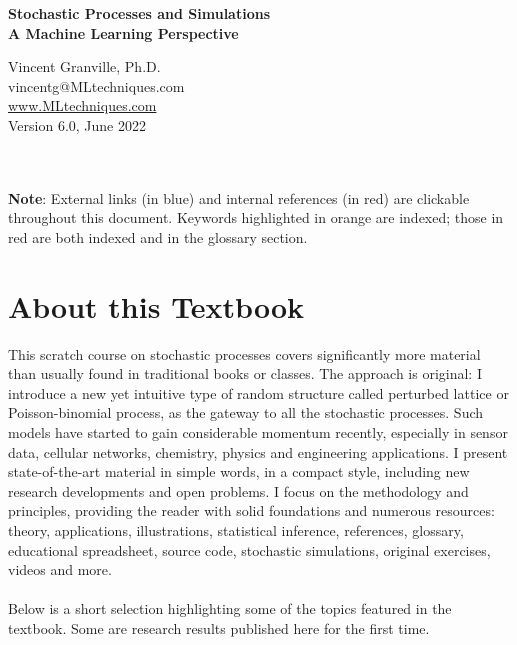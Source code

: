 \documentclass[10pt]{article}
\begin{document}
\hypersetup{linkcolor=blue}


\begin{center}
{\Large \bf{Stochastic Processes and Simulations\\
 \addvspace{1ex}
A Machine Learning Perspective}} \\
\addvspace{5ex}
\end{center}

\begin{center}
Vincent Granville, Ph.D.\\
vincentg@MLtechniques.com\\
 \href{https://mltechniques.com/}{www.MLtechniques.com}\\
\quad
Version 6.0, June 2022
\end{center}
\quad\\ \\
{\bf Note}: External links (in blue) and internal references (in red) are clickable throughout this document. Keywords highlighted in orange are indexed; those in red are both indexed and in the glossary section.


\hypersetup{linkcolor=red} %
\tableofcontents  %


\hypersetup{linkcolor=red}



\section*{About this Textbook}

This scratch course on stochastic processes covers significantly more material than usually found in traditional books or classes. The approach is original:  I introduce a new yet intuitive type of random structure called perturbed lattice or Poisson-binomial process,
as the gateway to all the stochastic processes. Such models have started to gain considerable momentum recently, especially in sensor data, cellular networks, chemistry, physics and engineering applications. I present state-of-the-art material in simple words, in a compact style, including new research developments and open problems. I focus on the methodology and principles, providing the reader with solid foundations and numerous resources: theory, applications, illustrations, statistical inference, references, glossary, educational spreadsheet, source code, stochastic simulations, original exercises, videos and more.  \\
\quad \\
Below is a short selection highlighting some of the topics featured in the textbook. Some are research results published here for the first time. \\
\quad \\
\end{document}
